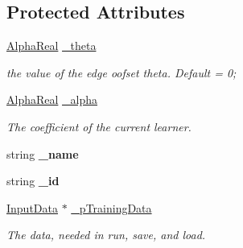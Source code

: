 \subsection*{Protected Attributes}
\begin{DoxyCompactItemize}
\item 
\hypertarget{classMultiBoost_1_1BaseLearner_aee790bde6888a60e2f136a731427edfa}{
\hyperlink{Defaults_8h_a80184c4fd10ab70a1a17c5f97dcd1563}{AlphaReal} \hyperlink{classMultiBoost_1_1BaseLearner_aee790bde6888a60e2f136a731427edfa}{\_\-theta}}
\label{classMultiBoost_1_1BaseLearner_aee790bde6888a60e2f136a731427edfa}

\begin{DoxyCompactList}\small\item\em the value of the edge oofset theta. Default = 0; \end{DoxyCompactList}\item 
\hypertarget{classMultiBoost_1_1BaseLearner_a042fb5ff66939dd2135d769308acc16e}{
\hyperlink{Defaults_8h_a80184c4fd10ab70a1a17c5f97dcd1563}{AlphaReal} \hyperlink{classMultiBoost_1_1BaseLearner_a042fb5ff66939dd2135d769308acc16e}{\_\-alpha}}
\label{classMultiBoost_1_1BaseLearner_a042fb5ff66939dd2135d769308acc16e}

\begin{DoxyCompactList}\small\item\em The coefficient of the current learner. \end{DoxyCompactList}\item 
\hypertarget{classMultiBoost_1_1BaseLearner_a92aead604a9bb1f29cc1ee1b8e24e0e7}{
string {\bfseries \_\-name}}
\label{classMultiBoost_1_1BaseLearner_a92aead604a9bb1f29cc1ee1b8e24e0e7}

\item 
\hypertarget{classMultiBoost_1_1BaseLearner_a611233a44538c97b02a1342945cf4a4c}{
string {\bfseries \_\-id}}
\label{classMultiBoost_1_1BaseLearner_a611233a44538c97b02a1342945cf4a4c}

\item 
\hypertarget{classMultiBoost_1_1BaseLearner_a4be60c4c6c2a41ecbf3599d1ce40c9e1}{
\hyperlink{classMultiBoost_1_1InputData}{InputData} $\ast$ \hyperlink{classMultiBoost_1_1BaseLearner_a4be60c4c6c2a41ecbf3599d1ce40c9e1}{\_\-pTrainingData}}
\label{classMultiBoost_1_1BaseLearner_a4be60c4c6c2a41ecbf3599d1ce40c9e1}

\begin{DoxyCompactList}\small\item\em The data, needed in run, save, and load. \end{DoxyCompactList}\end{DoxyCompactItemize}
